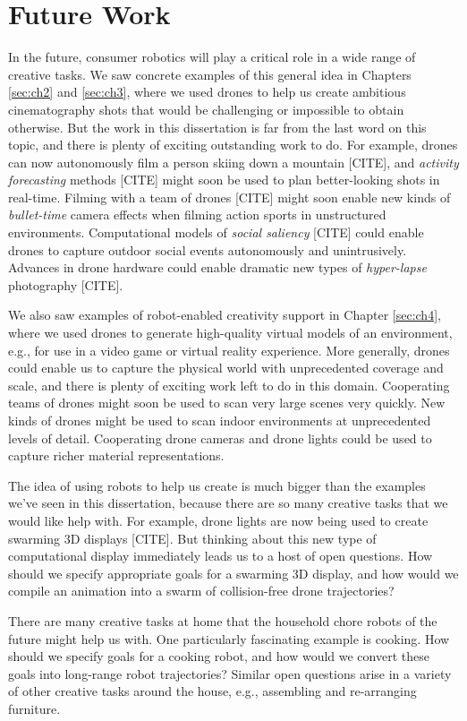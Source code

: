\section{Future Work}

In the future, consumer robotics will play a critical role in a wide range of creative tasks. 
We saw concrete examples of this general idea in Chapters \ref{sec:ch2} and \ref{sec:ch3}, where we used drones to help us create ambitious cinematography shots that would be challenging or impossible to obtain otherwise.
But the work in this dissertation is far from the last word on this topic, and there is plenty of exciting outstanding work to do.
For example, drones can now autonomously film a person skiing down a mountain [CITE], and \emph{activity forecasting} methods [CITE] might soon be used to plan better-looking shots in real-time.
Filming with a team of drones [CITE] might soon enable new kinds of \emph{bullet-time} camera effects when filming action sports in unstructured environments. Computational models of \emph{social saliency} [CITE] could enable drones to capture outdoor social events autonomously and unintrusively.
Advances in drone hardware could enable dramatic new types of \emph{hyper-lapse} photography [CITE].

We also saw examples of robot-enabled creativity support in Chapter \ref{sec:ch4}, where we used drones to generate high-quality virtual models of an environment, e.g., for use in a video game or virtual reality experience.
More generally, drones could enable us to capture the physical world with unprecedented coverage and scale, and there is plenty of exciting work left to do in this domain.
Cooperating teams of drones might soon be used to scan very large scenes very quickly.
New kinds of drones might be used to scan indoor environments at unprecedented levels of detail. Cooperating drone cameras and drone lights could be used to capture richer material representations.

The idea of using robots to help us create is much bigger than the examples we've seen in this dissertation, because there are so many creative tasks that we would like help with.
For example, drone lights are now being used to create swarming 3D displays [CITE].
But thinking about this new type of computational display immediately leads us to a host of open questions.
How should we specify appropriate goals for a swarming 3D display, and how would we compile an animation into a swarm of collision-free drone trajectories?

There are many creative tasks at home that the household chore robots of the future might help us with.
One particularly fascinating example is cooking. 
How should we specify goals for a cooking robot, and how would we convert these goals into long-range robot trajectories?
Similar open questions arise in a variety of other creative tasks around the house, e.g., assembling and re-arranging furniture.

